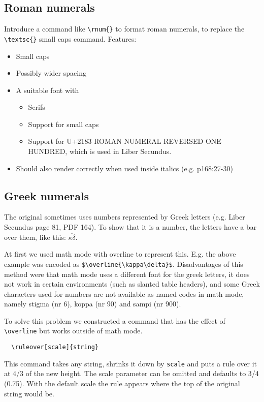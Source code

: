 \documentclass{report}
\begin{document}
\subsection{Roman numerals}
\label{subsec:roman_numerals}
Introduce a command like \verb+\rnum{}+ to format roman numerals, to replace
the \verb+\textsc{}+ small caps command. Features:
\begin{itemize}
\item Small caps
\item Possibly wider spacing
\item A suitable font with
\begin{itemize}
\item Serifs
\item Support for small caps
\item Support for U+2183 ROMAN NUMERAL REVERSED ONE HUNDRED, which is used
in Liber Secundus.
\end{itemize}
\item Should also render correctly when used inside italics (e.g. p168:27-30)
\end{itemize}

\subsection{Greek numerals}
\label{subsec:greek_numerals}
The original sometimes uses numbers represented by Greek letters
(e.g. Liber Secundus page 81, PDF 164). To show that it is a number, the
letters have a bar over them, like this: $\overline{\kappa\delta}$.

At first we used math mode with overline to represent this.
E.g. the above example was encoded as \verb+$\overline{\kappa\delta}$+.
Disadvantages of this method were that math mode uses a different
font for the greek letters,
it does not work in certain environments (such as slanted table headers),
and some Greek characters used for numbers are not available as named
codes in math mode, namely stigma (nr 6), koppa (nr 90) and sampi (nr 900).

To solve this problem we constructed a command that has the effect of
\verb+\overline+ but works outside of math mode.
\begin{verbatim}
  \ruleover[scale]{string}
\end{verbatim}
This command takes any string, shrinks it down by \verb+scale+ and
puts a rule over it at 4/3 of the new height.
The scale parameter can be omitted and defaults to 3/4 (0.75).
With the default scale the rule appears where the top of the original
string would be.
\end{document}

